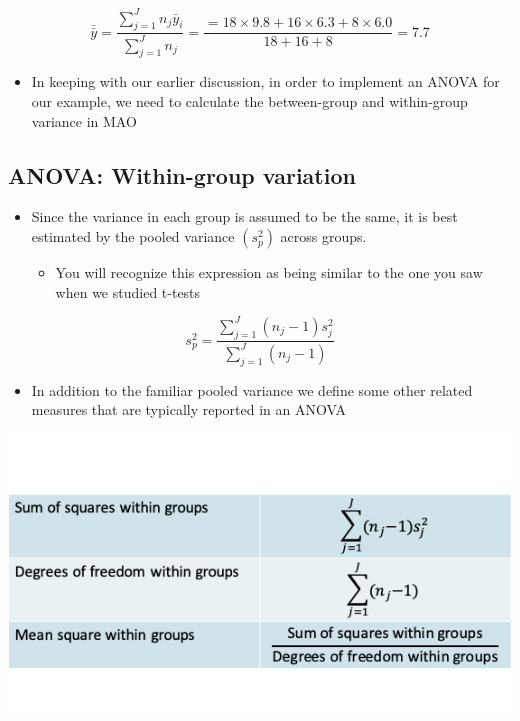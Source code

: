 \documentclass[
]{book}
\providecommand{\tightlist}{%
  \setlength{\itemsep}{0pt}\setlength{\parskip}{0pt}}
\begin{document}
\[\bar{\bar y}=\frac{\sum_{j=1}^Jn_j\bar y_{i}}{\sum_{j=1}^Jn_j}=\frac{=18\times9.8+16\times6.3+8\times6.0}{18+16+8}=7.7\]

\begin{itemize}
\tightlist
\item
  In keeping with our earlier discussion, in order to implement an ANOVA for our example, we need to calculate the between-group and within-group variance in MAO
\end{itemize}

\hypertarget{anova-within-group-variation}{%
\subsection{ANOVA: Within-group variation}\label{anova-within-group-variation}}

\begin{itemize}
\tightlist
\item
  Since the variance in each group is assumed to be the same, it is best estimated by the pooled variance \((s_p^2)\) across groups.

  \begin{itemize}
  \tightlist
  \item
    You will recognize this expression as being similar to the one you saw when we studied t-tests
  \end{itemize}
\end{itemize}

\[s_p^2=\frac{\sum_{j=1}^J(n_j-1)s_j^2}{\sum_{j=1}^J(n_j-1)}\]

\begin{itemize}
\tightlist
\item
  In addition to the familiar pooled variance we define some other related measures that are typically reported in an ANOVA
\end{itemize}

\includegraphics[width=1\linewidth]{./10_23}
\end{document}
